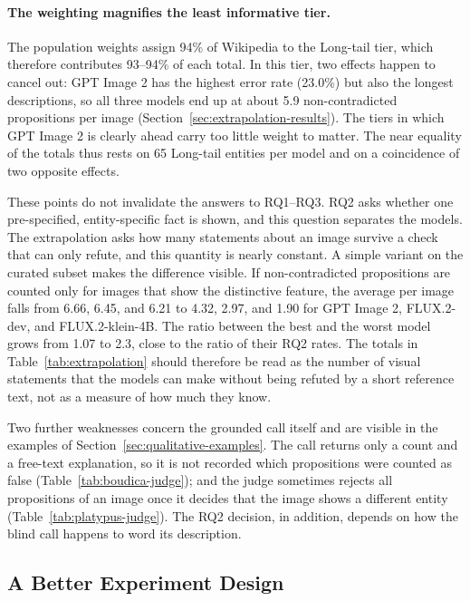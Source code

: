 \paragraph{The weighting magnifies the least informative tier.} The population
weights assign 94\% of Wikipedia to the Long-tail tier, which therefore
contributes 93--94\% of each total. In this tier, two effects happen to cancel
out: GPT Image 2 has the highest error rate (23.0\%) but also the longest
descriptions, so all three models end up at about 5.9 non-contradicted
propositions per image (Section~\ref{sec:extrapolation-results}). The tiers in
which GPT Image 2 is clearly ahead carry too little weight to matter. The near
equality of the totals thus rests on 65 Long-tail entities per model and on a
coincidence of two opposite effects.

These points do not invalidate the answers to RQ1--RQ3. RQ2 asks whether one
pre-specified, entity-specific fact is shown, and this question separates the
models. The extrapolation asks how many statements about an image survive a
check that can only refute, and this quantity is nearly constant. A simple
variant on the curated subset makes the difference visible. If
non-contradicted propositions are counted only for images that show the
distinctive feature, the average per image falls from 6.66, 6.45, and 6.21 to
4.32, 2.97, and 1.90 for GPT Image 2, FLUX.2-dev, and FLUX.2-klein-4B. The ratio
between the best and the worst model grows from 1.07 to 2.3, close to the ratio
of their RQ2 rates. The totals in Table~\ref{tab:extrapolation} should
therefore be read as the number of visual statements that the models can make
without being refuted by a short reference text, not as a measure of how much
they know.

Two further weaknesses concern the grounded call itself and are visible in the
examples of Section~\ref{sec:qualitative-examples}. The call returns only a
count and a free-text explanation, so it is not recorded which propositions
were counted as false (Table~\ref{tab:boudica-judge}); and the judge sometimes
rejects all propositions of an image once it decides that the image shows a
different entity (Table~\ref{tab:platypus-judge}). The RQ2 decision, in
addition, depends on how the blind call happens to word its description.

\subsection{A Better Experiment Design}

